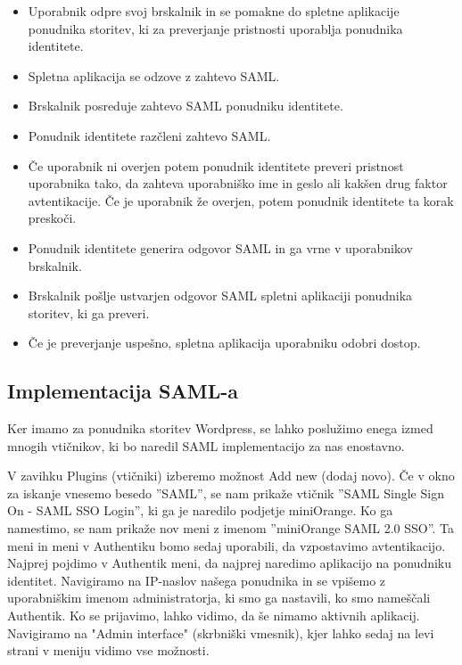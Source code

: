 \documentclass[a4paper,12pt,openright]{book}
\begin{document}
{\begin{itemize}
    \item Uporabnik odpre svoj brskalnik in se pomakne do spletne aplikacije ponudnika storitev, ki za preverjanje pristnosti uporablja ponudnika identitete.
    \item Spletna aplikacija se odzove z zahtevo SAML.
    \item Brskalnik posreduje zahtevo SAML ponudniku identitete.
    \item Ponudnik identitete razčleni zahtevo SAML.
    \item Če uporabnik ni overjen potem ponudnik identitete preveri pristnost uporabnika tako, da zahteva uporabniško ime in geslo ali kakšen drug faktor avtentikacije. Če je uporabnik že overjen, potem ponudnik identitete ta korak preskoči.
    \item Ponudnik identitete generira odgovor SAML in ga vrne v uporabnikov brskalnik.
    \item Brskalnik pošlje ustvarjen odgovor SAML spletni aplikaciji ponudnika storitev, ki ga preveri.
    \item Če je preverjanje uspešno, spletna aplikacija uporabniku odobri dostop.
\end{itemize}
    
\subsection{Implementacija SAML-a}

Ker imamo za ponudnika storitev Wordpress, se lahko poslužimo enega izmed mnogih vtičnikov, ki bo naredil SAML implementacijo za nas enostavno.  

V zavihku Plugins (vtičniki) izberemo možnost Add new (dodaj novo). Če v okno za iskanje vnesemo besedo ''SAML'', se nam prikaže vtičnik  ''SAML Single Sign On - SAML SSO Login'', ki ga je naredilo podjetje miniOrange\cite{miniOrange}. 
\newline
Ko ga namestimo, se nam prikaže nov meni z imenom ''miniOrange SAML 2.0 SSO''. Ta meni in meni v Authentiku bomo sedaj uporabili, da vzpostavimo avtentikacijo. 
\newline
Najprej pojdimo v Authentik meni, da najprej naredimo aplikacijo na ponudniku identitet. Navigiramo na IP-naslov našega ponudnika in se vpišemo z uporabniškim imenom administratorja, ki smo ga nastavili, ko smo nameščali Authentik. Ko se prijavimo, lahko vidimo, da še nimamo aktivnih aplikacij. Navigiramo na "Admin interface" (skrbniški vmesnik), kjer lahko sedaj na levi strani v meniju vidimo vse možnosti.

}
\end{document}
